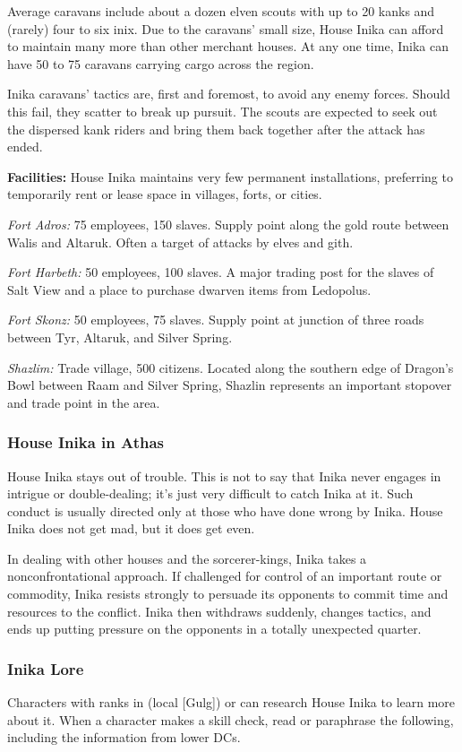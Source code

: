 Average caravans include about a dozen elven scouts with up to 20 kanks and (rarely) four to six inix. Due to the caravans' small size, House Inika can afford to maintain many more than other merchant houses. At any one time, Inika can have 50 to 75 caravans carrying cargo across the region.

Inika caravans' tactics are, first and foremost, to avoid any enemy forces. Should this fail, they scatter to break up pursuit. The scouts are expected to seek out the dispersed kank riders and bring them back together after the attack has ended.

\textbf{Facilities:} House Inika maintains very few permanent installations, preferring to temporarily rent or lease space in villages, forts, or cities.

\textit{Fort Adros:} 75 employees, 150 slaves. Supply point along the gold route between Walis and Altaruk. Often a target of attacks by elves and gith.

\textit{Fort Harbeth:} 50 employees, 100 slaves. A major trading post for the slaves of Salt View and a place to purchase dwarven items from Ledopolus.

\textit{Fort Skonz:} 50 employees, 75 slaves. Supply point at junction of three roads between Tyr, Altaruk, and Silver Spring.

\textit{Shazlim:} Trade village, 500 citizens. Located along the southern edge of Dragon's Bowl between Raam and Silver Spring, Shazlin represents an important stopover and trade point in the area.

\subsubsection{House Inika in Athas}
House Inika stays out of trouble. This is not to say that Inika never engages in intrigue or double-dealing; it's just very difficult to catch Inika at it. Such conduct is usually directed only at those who have done wrong by Inika. House Inika does not get mad, but it does get even.

In dealing with other houses and the sorcerer-kings, Inika takes a nonconfrontational approach. If challenged for control of an important route or commodity, Inika resists strongly to persuade its opponents to commit time and resources to the conflict. Inika then withdraws suddenly, changes tactics, and ends up putting pressure on the opponents in a totally unexpected quarter.

\subsubsection{Inika Lore}
Characters with ranks in  (local [Gulg]) or  can research House Inika to learn more about it. When a character makes a skill check, read or paraphrase the following, including the information from lower DCs.

